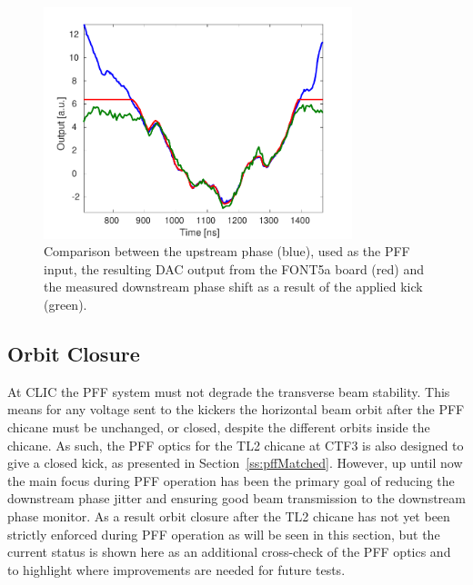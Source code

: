 \begin{figure}
  \centering
  \includegraphics[width=0.8\textwidth]{Figures/commissioning/pffKickShape}
  \caption{Comparison between the upstream phase (blue), used as the PFF input, the resulting DAC output from the FONT5a board (red) and the measured downstream phase shift as a result of the applied kick (green).}
  \label{f:pffKickShape}
\end{figure}

\subsection{Orbit Closure}
\label{ss:orbitClosure}

At CLIC the PFF system must not degrade the transverse beam stability. This means for any voltage sent to the kickers the horizontal beam orbit after the PFF chicane must be unchanged, or closed, despite the different orbits inside the chicane. As such, the PFF optics for the TL2 chicane at CTF3 is also designed to give a closed kick, as presented in Section~\ref{ss:pffMatched}. However, up until now the main focus during PFF operation has been the primary goal of reducing the downstream phase jitter and ensuring good beam transmission to the downstream phase monitor. As a result orbit closure after the TL2 chicane has not yet been strictly enforced during PFF operation as will be seen in this section, but the current status is shown here as an additional cross-check of the PFF optics and to highlight where improvements are needed for future tests.

